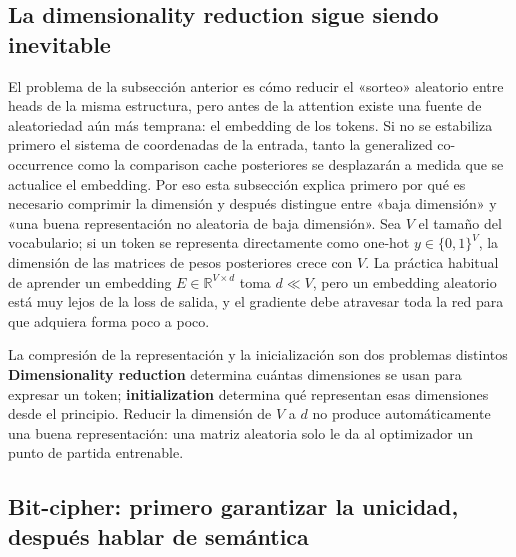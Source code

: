 \subsection{La dimensionality reduction sigue siendo inevitable}

El problema de la subsección anterior es cómo reducir el «sorteo» aleatorio entre heads de la misma estructura, pero antes de la attention existe una fuente de aleatoriedad aún más temprana: el embedding de los tokens. Si no se estabiliza primero el sistema de coordenadas de la entrada, tanto la generalized co-occurrence como la comparison cache posteriores se desplazarán a medida que se actualice el embedding. Por eso esta subsección explica primero por qué es necesario comprimir la dimensión y después distingue entre «baja dimensión» y «una buena representación no aleatoria de baja dimensión». Sea $V$ el tamaño del vocabulario; si un token se representa directamente como one-hot $y\in\{0,1\}^{V}$, la dimensión de las matrices de pesos posteriores crece con $V$. La práctica habitual de aprender un embedding $E\in\mathbb{R}^{V\times d}$ toma $d\ll V$, pero un embedding aleatorio está muy lejos de la loss de salida, y el gradiente debe atravesar toda la red para que adquiera forma poco a poco.


\begin{importantbox}{La compresión de la representación y la inicialización son dos problemas distintos}
\textbf{Dimensionality reduction} determina cuántas dimensiones se usan para expresar un token; \textbf{initialization} determina qué representan esas dimensiones desde el principio. Reducir la dimensión de $V$ a $d$ no produce automáticamente una buena representación: una matriz aleatoria solo le da al optimizador un punto de partida entrenable.
\end{importantbox}


\subsection{Bit-cipher: primero garantizar la unicidad, después hablar de semántica}

